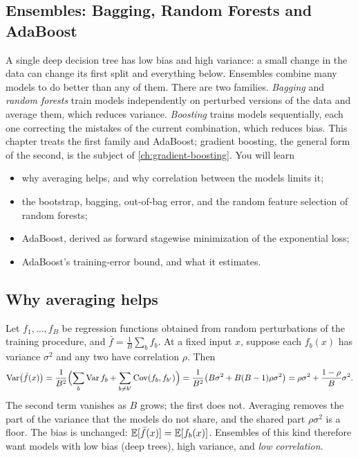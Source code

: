 \begin{notechapter}
\chapter{Ensembles: Bagging, Random Forests and AdaBoost}\label{ch:ensemble-methods}

\begin{chapterintro}
A single deep decision tree has low bias and high variance: a small change in the data
can change its first split and everything below. Ensembles combine many models to do
better than any of them. There are two families. \emph{Bagging} and \emph{random forests}
train models independently on perturbed versions of the data and average them, which
reduces variance. \emph{Boosting} trains models sequentially, each one correcting the
mistakes of the current combination, which reduces bias. This chapter treats the
first family and AdaBoost; gradient boosting, the general form of the second, is the
subject of \cref{ch:gradient-boosting}. You will learn
\begin{itemize}[nosep]
  \item why averaging helps, and why correlation between the models limits it;
  \item the bootstrap, bagging, out-of-bag error, and the random feature selection of
        random forests;
  \item AdaBoost, derived as forward stagewise minimization of the exponential loss;
  \item AdaBoost's training-error bound, and what it estimates.
\end{itemize}
\end{chapterintro}

\section{Why averaging helps}\label{ensemble-methods:sec:averaging}

Let $f_1,\dots,f_B$ be regression functions obtained from random perturbations of the
training procedure, and $\bar f = \frac1B\sum_bf_b$. At a fixed input $x$, suppose each $f_b(x)$ has
variance $\sigma^2$ and any two have correlation $\rho$. Then
\[
  \operatorname{Var}\bigl(\bar f(x)\bigr) = \frac1{B^2}\Bigl(\sum_b\operatorname{Var} f_b + \sum_{b\neq b'}\operatorname{Cov}(f_b, f_{b'})\Bigr)
  = \frac1{B^2}\bigl(B\sigma^2 + B(B - 1)\rho\sigma^2\bigr)
  = \rho\sigma^2 + \frac{1 - \rho}B\sigma^2 .
\]
The second term vanishes as $B$ grows; the first does not. Averaging removes the part of
the variance that the models do not share, and the shared part $\rho\sigma^2$ is a floor. The bias
is unchanged: $\mathbb{E}[\bar f(x)] = \mathbb{E}[f_b(x)]$. Ensembles of this kind therefore want models with low bias
(deep trees), high variance, and \emph{low correlation}.


\end{notechapter}
